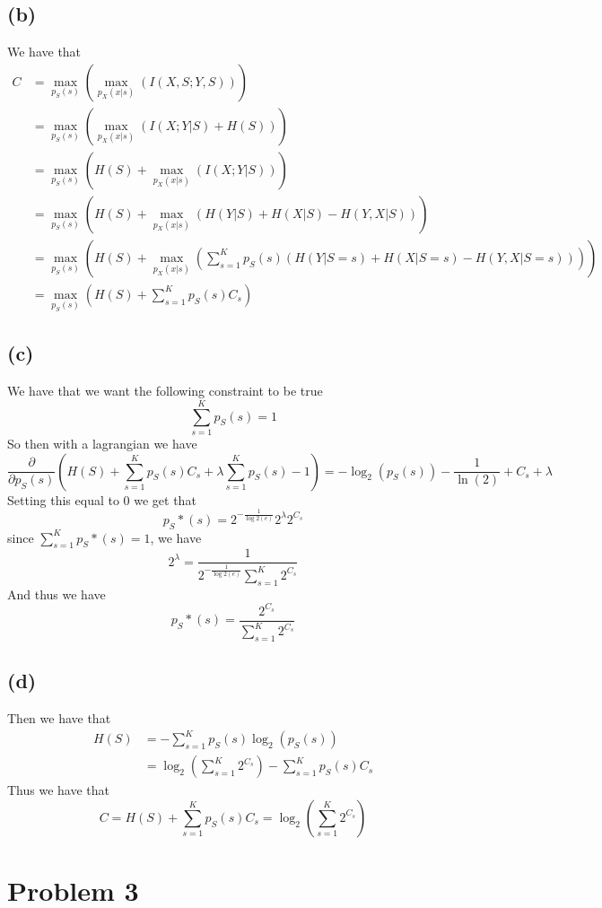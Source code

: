 \subsection*{(b)}
We have that 
\begin{align*}
    C&=\max_{p_S(s)}\left(\max_{p_X(x|s)}\left(I(X,S;Y,S)\right)\right)\\
    &=\max_{p_S(s)}\left(\max_{p_X(x|s)}\left(I(X;Y|S)+H(S)\right)\right)\\
    &=\max_{p_S(s)}\left(H(S)+\max_{p_X(x|s)}\left(I(X;Y|S)\right)\right)\\
    &=\max_{p_S(s)}\left(H(S)+\max_{p_X(x|s)}\left(H(Y|S)+H(X|S)-H(Y,X|S)\right)\right)\\
    &=\max_{p_S(s)}\left(H(S)+\max_{p_X(x|s)}\left(\sum_{s=1}^{K}p_S(s)(H(Y|S=s)+H(X|S=s)-H(Y,X|S=s))\right)\right)\\
    &=\max_{p_S(s)}\left(H(S)+\sum_{s=1}^{K}p_S(s)C_s\right)
\end{align*}
\subsection*{(c)}
We have that we want the following constraint to be true
$$\sum_{s=1}^{K}p_S(s)=1$$
So then with a lagrangian we have
$$\frac{\partial}{\partial p_S(s)}\left(H(S)+\sum_{s=1}^{K}p_S(s)C_s+\lambda\sum_{s=1}^{K}p_S(s)-1\right)=-\log_2(p_S(s))-\frac{1}{\ln(2)}+C_s+\lambda$$
Setting this equal to 0 we get that 
$$p_S*(s)=2^{-\frac{1}{\log2(e)}}2^{\lambda}2^{C_s}$$
since $\sum_{s=1}^{K}p_S*(s)=1$, we have
$$2^{\lambda}=\frac{1}{2^{-\frac{1}{\log2(e)}}\sum_{s=1}^{K}2^{C_s}}$$
And thus we have 
$$p_S*(s)=\boxed{\frac{2^{C_s}}{\sum_{s=1}^{K}2^{C_s}}}$$
\subsection*{(d)}
Then we have that 
\begin{align*}
    H(S)&=-\sum_{s=1}^{K}p_S(s)\log_2(p_S(s))\\
    &=\log_2\left(\sum_{s=1}^{K}2^{C_s}\right)-\sum_{s=1}^{K}p_S(s) C_s
\end{align*}
Thus we have that
$$C=H(S)+\sum_{s=1}^{K}p_S(s) C_s=\log_2\left(\sum_{s=1}^{K}2^{C_s}\right)$$
\section*{Problem 3}

